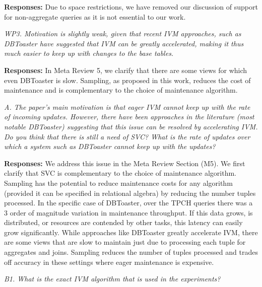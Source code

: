 \vspace{.25em}

{\bf Responses:} Due to space restrictions, we have removed our discussion of support for non-aggregate queries as it is not essential to our work. 

\vspace{1em}
\emph{WP3. Motivation is slightly weak, given that recent IVM approaches, such as DBToaster have suggested that IVM can be greatly accelerated, making it thus much easier to keep up with changes to the base tables.}

\vspace{.25em}

{\bf Responses:} In Meta Review 5, we clarify that there are some views for which even DBToaster is slow. Sampling, as proposed in this work, reduces the cost of maintenance and is complementary to the choice of maintenance algorithm.

\vspace{1em}
\emph{A. The paper's main motivation is that eager IVM cannot keep up with the rate of incoming updates. However, there have been approaches in the literature (most notable DBToaster) suggesting that this issue can be resolved by accelerating IVM. Do you think that there is still a need of SVC? What is the rate of updates over which a system such as DBToaster cannot keep up with the updates?}

\vspace{.25em}

{\bf Responses:} 
We address this issue in the Meta Review Section (M5). We first clarify that SVC is complementary to the choice of maintenance algorithm. Sampling has the potential to reduce maintenance costs for any algorithm (provided it can be specified in relational algebra) by reducing the number tuples processed. In the specific case of DBToaster, over the TPCH queries there was a 3 order of magnitude variation in maintenance throughput. If this data grows, is distributed, or resources are contended by other tasks, this latency can easily grow significantly. While approaches like DBToaster greatly accelerate IVM, there are some views that are slow to maintain just due to processing each tuple for aggregates and joins. Sampling reduces the number of tuples processed and trades off accuracy in these settings where eager maintenance is expensive. 

\vspace{1em}
\emph{B1. What is the exact IVM algorithm that is used in the experiments?}

